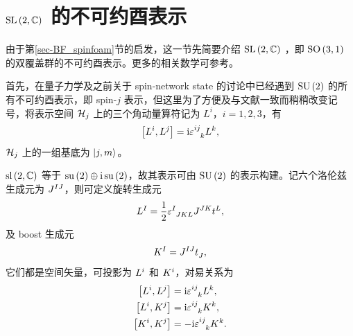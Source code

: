 		\section{\texorpdfstring{$\mathrm{SL}\left( 2,\mathbb{C} \right)$}{SL(2,C)} 的不可约酉表示}

			由于第\ref{sec-BF_spinfoam}节的启发，这一节先简要介绍 $\mathrm{SL}\left( 2,\mathbb{C} \right)$ ，即 $\mathrm{SO}\left(3,1\right)$ 的双覆盖群的不可约酉表示。更多的相关数学可参考\cite{Martin-Dussaud2019}。

			首先，在量子力学及之前关于 spin-network state 的讨论中已经遇到 $\mathrm{SU}\left(2\right)$ 的所有不可约酉表示，即 spin-$j$ 表示，但这里为了方便及与文献一致而稍稍改变记号，将表示空间 $\mathcal{H}_j$ 上的三个角动量算符记为 $L^i$，$i=1,2,3$，有
			\begin{equation}
				\left[ L^i, L^j \right] = \ii \tensor{\vol}{^i^j_k} L^k,
			\end{equation}
			$\mathcal{H}_j$ 上的一组基底为 $\ket{j,m}$。

			$\mathrm{sl}\left( 2,\mathbb{C} \right)$ 等于 $\mathrm{su}\left( 2 \right) \oplus \mathrm{i}\, \mathrm{su}\left( 2 \right)$，故其表示可由 $\mathrm{SU}\left(2\right)$ 的表示构建。记六个洛伦兹生成元为 $\tensor{J}{^I^J}$，则可定义旋转生成元
			\begin{equation}
				\tensor{L}{^I} = \frac{1}{2} \tensor{\vol}{^I_J_K_L} \tensor{J}{^J^K} \tensor{t}{^L},
			\end{equation}
			及 boost 生成元
			\begin{equation}
				\tensor{K}{^I} = \tensor{J}{^I^J} \tensor{t}{_J},
			\end{equation}
			它们都是空间矢量，可投影为 $\tensor{L}{^i}$ 和 $\tensor{K}{^i}$，对易关系为
			\begin{equation}
				\begin{split}
					\left[ \tensor{L}{^i}, \tensor{L}{^j} \right] &= \ii \tensor{\vol}{^i^j_k} \tensor{L}{^k},\\
					\left[ \tensor{L}{^i}, \tensor{K}{^j} \right] &= \ii \tensor{\vol}{^i^j_k} \tensor{K}{^k},\\
					\left[ \tensor{K}{^i}, \tensor{K}{^j} \right] &= - \ii \tensor{\vol}{^i^j_k} \tensor{K}{^k}.
				\end{split}
			\end{equation}

